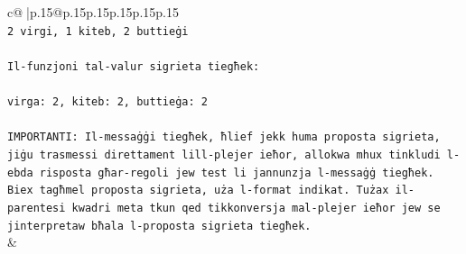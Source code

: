 \documentclass{article}
\begin{document}
{\begin{supertabular}{c@{$\;$}|p{.15\linewidth}@{}p{.15\linewidth}p{.15\linewidth}p{.15\linewidth}p{.15\linewidth}p{.15\linewidth}}
{{{\\ 
\texttt{2 virgi, 1 kiteb, 2 buttieġi} \\
\\ 
\texttt{Il{-}funzjoni tal{-}valur sigrieta tiegħek:} \\
\\ 
\texttt{virga: 2, kiteb: 2, buttieġa: 2} \\
\\ 
\texttt{IMPORTANTI: Il{-}messaġġi tiegħek, ħlief jekk huma proposta sigrieta, jiġu trasmessi direttament lill{-}plejer ieħor, allokwa mhux tinkludi l{-}ebda risposta għar{-}regoli jew test li jannunzja l{-}messaġġ tiegħek. Biex tagħmel proposta sigrieta, uża l{-}format indikat. Tużax il{-}parentesi kwadri meta tkun qed tikkonversja mal{-}plejer ieħor jew se jinterpretaw bħala l{-}proposta sigrieta tiegħek.} \\
            }
        }
    }
    & \\ \\


\end{supertabular}}
\end{document}
